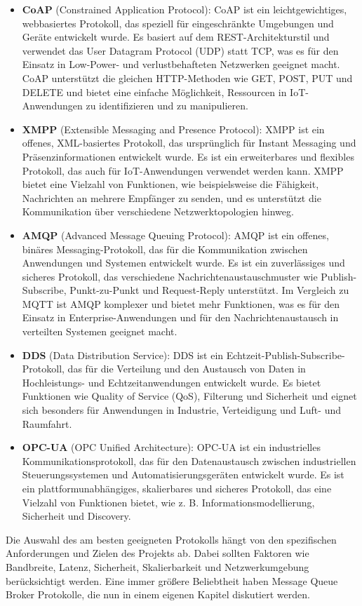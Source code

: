 \documentclass[../vs-script-first-v01.tex]{subfiles}
\begin{document}
\begin{itemize}
\item \textbf{CoAP} (Constrained Application Protocol): CoAP ist ein leichtgewichtiges, webbasiertes Protokoll, das speziell für eingeschränkte Umgebungen und Geräte entwickelt wurde. Es basiert auf dem REST-Architekturstil und verwendet das User Datagram Protocol (UDP) statt TCP, was es für den Einsatz in Low-Power- und verlustbehafteten Netzwerken geeignet macht. CoAP unterstützt die gleichen HTTP-Methoden wie GET, POST, PUT und DELETE und bietet eine einfache Möglichkeit, Ressourcen in IoT-Anwendungen zu identifizieren und zu manipulieren.
\item \textbf{XMPP} (Extensible Messaging and Presence Protocol): XMPP ist ein offenes, XML-basiertes Protokoll, das ursprünglich für Instant Messaging und Präsenzinformationen entwickelt wurde. Es ist ein erweiterbares und flexibles Protokoll, das auch für IoT-Anwendungen verwendet werden kann. XMPP bietet eine Vielzahl von Funktionen, wie beispielsweise die Fähigkeit, Nachrichten an mehrere Empfänger zu senden, und es unterstützt die Kommunikation über verschiedene Netzwerktopologien hinweg.
\item \textbf{AMQP} (Advanced Message Queuing Protocol): AMQP ist ein offenes, binäres Messaging-Protokoll, das für die Kommunikation zwischen Anwendungen und Systemen entwickelt wurde. Es ist ein zuverlässiges und sicheres Protokoll, das verschiedene Nachrichtenaustauschmuster wie Publish-Subscribe, Punkt-zu-Punkt und Request-Reply unterstützt. Im Vergleich zu MQTT ist AMQP komplexer und bietet mehr Funktionen, was es für den Einsatz in Enterprise-Anwendungen und für den Nachrichtenaustausch in verteilten Systemen geeignet macht.
\item \textbf{DDS} (Data Distribution Service): DDS ist ein Echtzeit-Publish-Subscribe-Protokoll, das für die Verteilung und den Austausch von Daten in Hochleistungs- und Echtzeitanwendungen entwickelt wurde. Es bietet Funktionen wie Quality of Service (QoS), Filterung und Sicherheit und eignet sich besonders für Anwendungen in Industrie, Verteidigung und Luft- und Raumfahrt.
\item \textbf{OPC-UA} (OPC Unified Architecture): OPC-UA ist ein industrielles Kommunikationsprotokoll, das für den Datenaustausch zwischen industriellen Steuerungssystemen und Automatisierungsgeräten entwickelt wurde. Es ist ein plattformunabhängiges, skalierbares und sicheres Protokoll, das eine Vielzahl von Funktionen bietet, wie z. B. Informationsmodellierung, Sicherheit und Discovery.
\end{itemize}
Die Auswahl des am besten geeigneten Protokolls hängt von den spezifischen Anforderungen und Zielen des Projekts ab. Dabei sollten Faktoren wie Bandbreite, Latenz, Sicherheit, Skalierbarkeit und Netzwerkumgebung berücksichtigt werden. Eine immer größere Beliebtheit haben Message Queue Broker Protokolle, die nun in einem eigenen Kapitel diskutiert werden.  
\end{document}
